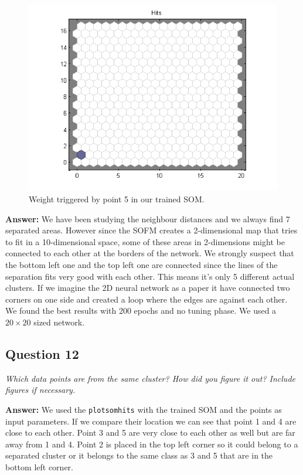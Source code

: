 \documentclass[a4paper]{article}
\begin{document}
 \begin{figure}[H] %
	 \includegraphics[]{point5.png}
	 \caption{\label{fig:point5} Weight triggered by point 5 in our trained SOM.}
 \end{figure}

\textbf{Answer:} We have been studying the neighbour distances and we always find 7 separated areas. However since the SOFM creates a 2-dimensional map that tries to fit in a 10-dimensional space, some of these areas in 2-dimensions might be connected to each other at the borders of the network. We strongly suspect that the bottom left one and the top left one are connected since the lines of the separation fits very good with each other. This means it's only 5 different actual clusters. If we imagine the 2D neural network as a paper it have connected two corners on one side and created a loop where the edges are against each other. 
We found the best results with 200 epochs and no tuning phase. We used a $20 \times 20$ sized network.


\subsection*{Question 12}
\emph{Which data points are from the same cluster? How did you
figure it out? Include figures if necessary.} 

\textbf{Answer:} We used the \texttt{plotsomhits} with the trained SOM and the points as input parameters. If we compare their location we can see that point 1 and 4 are close to each other. Point 3 and 5 are very close to each other as well but are far away from 1 and 4. Point 2 is placed in the top left corner so it could belong to a separated cluster or it belongs to the same class as 3 and 5 that are in the bottom left corner.
\end{document}
